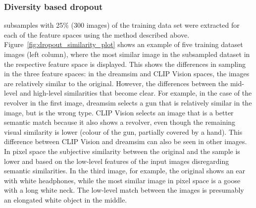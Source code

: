 \subsubsection{Diversity based dropout}
 subsamples with 25\% (300 images) of the training data set were extracted for each of the feature spaces using the method described above. Figure~\ref{fig:dropout_similarity_plot} shows an example of five training dataset images (left column), where the most similar image in the subsampled dataset in the respective feature space is displayed. This shows the differences in sampling in the three feature spaces: in the dreamsim and CLIP Vision spaces, the images are relatively similar to the original. However, the  differences between the mid-level and high-level similarities that become clear. For example, in the case of the revolver in the first image, dreamsim selects a gun that is relatively similar in the image, but is the wrong type. CLIP Vision selects an image that is a better semantic match because it also shows a revolver, even though the remaining visual similarity is lower (colour of the gun, partially covered by a hand). This difference between CLIP Vision and dreamsim can also be seen in other images. In pixel space the subjective similarity between the original and the sample is lower and based on the low-level features of the input images disregarding semantic similarities. In the third image, for example, the original shows an ear with white headphones, while the most similar image in pixel space is a goose with a long white neck. The low-level match between the images is presumably an elongated white object in the middle. 

